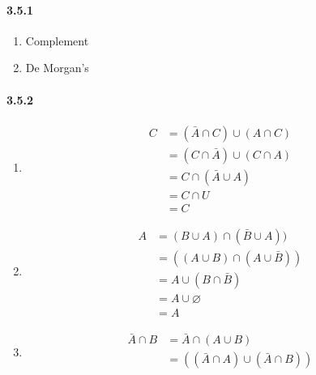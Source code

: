 \documentclass[11pt, letterpaper, twocolumn, fleqn]{article}
\let\emptyset\varnothing
\begin{document}
    \paragraph{3.5.1}
    \renewcommand{\labelenumi}{\alph{enumi}.}
    \begin{enumerate}
        \item Complement
        \addtocounter{enumi}{1}
        \item De Morgan's 
    \end{enumerate}
    
    \paragraph{3.5.2}
    \renewcommand{\labelenumi}{\alph{enumi}.}
    \begin{enumerate}
        \item 
            \begin{align*}
                C   & = (\bar{A} \cap C) \cup (A \cap C)    \\
                    & = (C \cap \bar{A}) \cup (C \cap A)    \tag{Commutative} \\
                    & = C \cap (\bar{A} \cup A)             \tag{Distributive} \\
                    & = C \cap U                            \tag{Complement} \\
                    & = C                                   \tag{Identity}
            \end{align*}
        \item
            \begin{align*}
                A   &= (B \cup A) \cap (\bar{B} \cup A ))   \\
                    &= ((A \cup B) \cap (A \cup \bar{B}))   \tag{Commutative}\\
                    &= A \cup (B \cap \bar{B})              \tag{Distributive}\\
                    &= A \cup \emptyset                     \tag{Complement}\\
                    &= A                                    \tag{Identity}
            \end{align*}
        \addtocounter{enumi}{1}
        \item
            \begin{align*}
                \bar{A} \cap B &= \bar{A} \cap (A \cup B) \\
                               &=((\bar{A} \cap A)\cup(\bar{A} \cap B)) \tag{Distributive}\\

\end{align*}
\end{enumerate}
\end{document}
